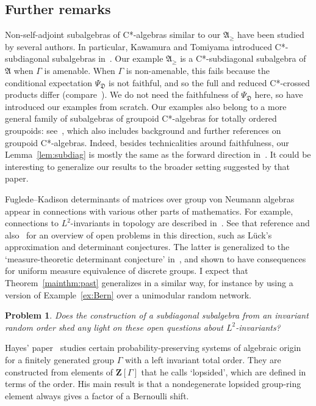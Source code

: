 \documentclass[12pt,a4paper]{article}
\numberwithin{equation}{section}
\newtheorem{prob}[thm]{Problem}
\theoremstyle{remark}
\newcommand{\bbZ}{\mathbf{Z}}
\newcommand{\A}{\mathfrak{A}}
\newcommand{\frD}{\mathfrak{D}}
\newcommand{\G}{\Gamma}
\begin{document}
\subsection{Further remarks}\label{subs:B-rmks}

Non-self-adjoint subalgebras of C*-algebras similar to our $\A_\ge$ have been studied by several authors.  In particular, Kawamura and Tomiyama introduced C*-subdiagonal subalgebras in~\cite[Sec. 3]{KawTom77}.  Our example $\A_\ge$ is a C*-subdiagonal subalgebra of $\A$ when $\G$ is amenable.  When $\G$ is non-amenable, this fails because the conditional expectation $\Psi_\frD$ is not faithful, and so the full and reduced C*-crossed products differ (compare~\cite[Cor. 5.6.17]{BroOza08}).   We do not need the faithfulness of $\Psi_\frD$ here, so have introduced our examples from scratch. Our examples also belong to a more general family of subalgebras of groupoid C*-algebras for totally ordered groupoids: see~\cite{MuhSol89}, which also includes background and further references on groupoid C*-algebras.  Indeed, besides technicalities around faithfulness, our Lemma~\ref{lem:subdiag} is mostly the same as the forward direction in~\cite[Thm. 4.2]{MuhSol89}.  It could be interesting to generalize our results to the broader setting suggested by that paper.

Fuglede--Kadison determinants of matrices over group von Neumann algebras appear in connections with various other parts of mathematics.  For example, connections to $L^2$-invariants in topology are described in~\cite[Sec. 3.2 and Chap. 13]{Luc02}.  See that reference and also~\cite{KirKreLuc25} for an overview of open problems in this direction, such as L\"{u}ck's approximation and determinant conjectures.  The latter is generalized to the `measure-theoretic determinant conjecture' in~\cite{LucSauWeg10}, and shown to have consequences for uniform measure equivalence of discrete groups. I expect that Theorem~\ref{mainthm:past} generalizes in a similar way, for instance by using a version of Example~\ref{ex:Bern} over a unimodular random network.

\begin{prob}
Does the construction of a subdiagonal subalgebra from an invariant random order shed any light on these open questions about $L^2$-invariants?
\end{prob}

Hayes' paper~\cite{Hayes21b} studies certain probability-preserving systems of algebraic origin for a finitely generated group $\G$ with a left invariant total order.  They are constructed from elements of $\bbZ[\G]$ that he calls `lopsided', which are defined in terms of the order.  His main result is that a nondegenerate lopsided group-ring element always gives a factor of a Bernoulli shift.
\end{document}
